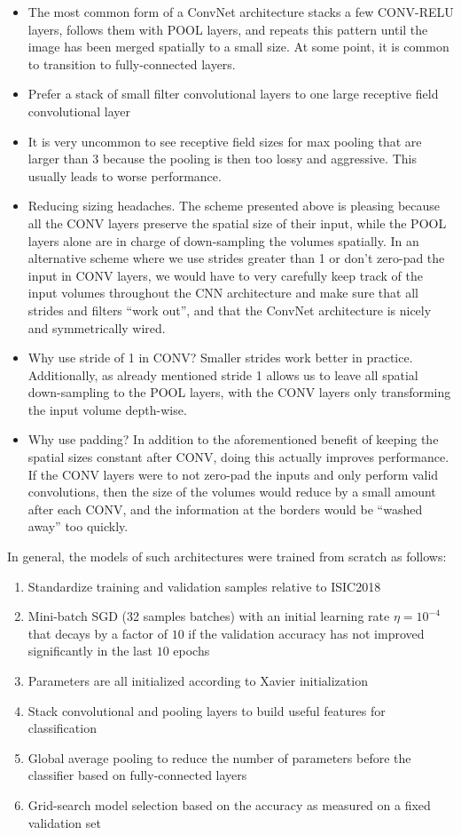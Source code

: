 \begin{itemize}
    \item The most common form of a ConvNet architecture stacks a few CONV-RELU layers, follows them with POOL layers, and repeats this pattern until the image has been merged spatially to a small size. At some point, it is common to transition to fully-connected layers.
    \item Prefer a stack of small filter convolutional layers to one large receptive field convolutional layer
    \item It is very uncommon to see receptive field sizes for max pooling that are larger than 3 because the pooling is then too lossy and aggressive. This usually leads to worse performance.
    \item Reducing sizing headaches. The scheme presented above is pleasing because all the CONV layers preserve the spatial size of their input, while the POOL layers alone are in charge of down-sampling the volumes spatially. In an alternative scheme where we use strides greater than 1 or don’t zero-pad the input in CONV layers, we would have to very carefully keep track of the input volumes throughout the CNN architecture and make sure that all strides and filters “work out”, and that the ConvNet architecture is nicely and symmetrically wired.
    \item Why use stride of 1 in CONV? Smaller strides work better in practice. Additionally, as already mentioned stride 1 allows us to leave all spatial down-sampling to the POOL layers, with the CONV layers only transforming the input volume depth-wise.
    \item Why use padding? In addition to the aforementioned benefit of keeping the spatial sizes constant after CONV, doing this actually improves performance. If the CONV layers were to not zero-pad the inputs and only perform valid convolutions, then the size of the volumes would reduce by a small amount after each CONV, and the information at the borders would be “washed away” too quickly.
\end{itemize}

In general, the models of such architectures were trained from scratch as follows:

\begin{enumerate}
    \item Standardize training and validation samples relative to ISIC2018
    \item Mini-batch \ac{SGD} (32 samples batches) with an initial learning rate $\eta = 10^{-4}$ that decays by a factor of $10$ if the validation accuracy has not improved significantly in the last $10$ epochs
    \item Parameters are all initialized according to Xavier initialization
    \item Stack convolutional and pooling layers to build useful features for classification
    \item Global average pooling to reduce the number of parameters before the classifier based on fully-connected layers
    \item Grid-search model selection based on the accuracy as measured on a fixed validation set
\end{enumerate}

